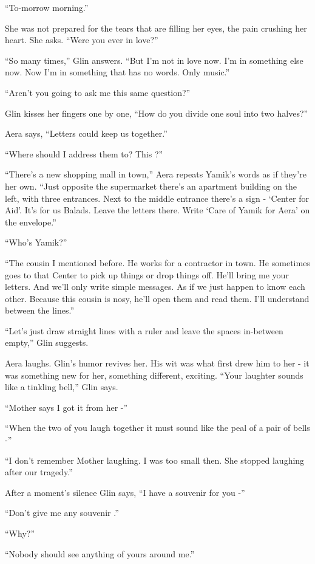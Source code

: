 \documentclass[twoside,11pt]{book}
\begin{document}
``To-morrow morning.''

She was not prepared for the tears that are filling her eyes, the pain crushing her heart. She asks. ``Were
you ever in love?''

``So many times,'' Glin answers. ``But I'm not in love now. I'm in something else
now. Now I'm in something that has no words. Only music.''

``Aren't you going to ask me this same question?''

Glin kisses her fingers one by one, ``How do you divide one soul into two halves?''

Aera says, ``Letters could keep us together.''

``Where should I address them to? This ?''

``There's a new shopping mall in town,'' Aera repeats Yamik's words as if they're her own.
``Just opposite the supermarket there's an apartment building on the left, with three entrances. Next to
the middle entrance there's a sign - `Center for Aid'. It's for us Balads. Leave the letters there. Write `Care of
Yamik for Aera' on the envelope.''

``Who's Yamik?''

``The cousin I mentioned before. He works for a contractor in town. He sometimes goes to that Center to
pick up things or drop things off.  He'll bring me your letters. And we'll only write simple messages. As if we just
happen to know each other. Because this cousin is nosy, he'll open them and read them. I'll understand between the
lines.''

``Let's just draw straight lines with a ruler and leave the spaces in-between empty,'' Glin
suggests.

Aera laughs.  Glin's humor revives her. His wit was what first drew him to her - it was something new for her, something
different, exciting. ``Your laughter sounds like a tinkling bell,'' Glin says.

``Mother says I got it from her -''

``When the two of you laugh together it must sound like the peal of a pair of bells -''

``I don't remember Mother laughing. I was too small then. She stopped laughing after our
tragedy.''

After a moment's silence Glin says, ``I have a souvenir for you -''

``Don't give me any souvenir .''

``Why?''

``Nobody should see anything of yours around me.''
\end{document}
